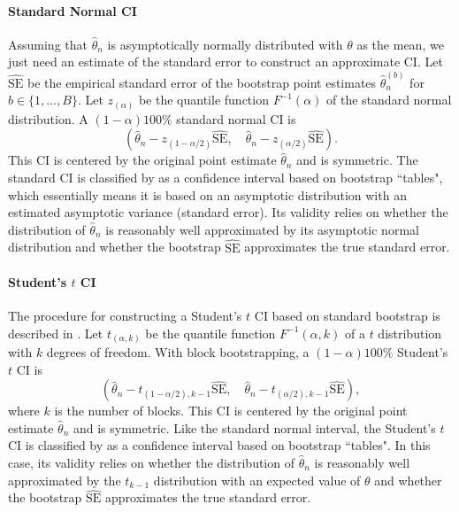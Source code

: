 \documentclass[10pt]{article}
\begin{document}
\paragraph{Standard Normal CI}
Assuming that $\hat\theta_n$ is asymptotically normally distributed with 
$\theta$ as the mean, we just need an estimate of the standard error to 
construct an approximate CI.\citep{efron1993introduction} Let
$\widehat{\text{SE}}$ be the empirical standard error of the bootstrap point 
estimates $\hat\theta_n^{(b)}$ for $b \in \{1, \ldots, B\}$. Let $z_{(\alpha)}$ 
be the quantile function $F^{-1}(\alpha)$ of the standard normal distribution. 
A $(1 - \alpha)100\%$ standard normal CI is
\[
(\hat{\theta}_{n} - z_{(1-\alpha/2)}\widehat{\text{SE}}, \quad
\hat{\theta}_{n} - z_{(\alpha/2)}\widehat{\text{SE}}).
\]
This CI is centered by the original point estimate $\hat\theta_n$ and is 
symmetric. The standard CI is classified by \citet{efron1993introduction} 
as a confidence interval based on bootstrap ``tables", which essentially means 
it is based on an asymptotic 
distribution with an estimated asymptotic variance (standard error). Its 
validity relies on whether the distribution of $\hat\theta_n$ is reasonably well 
approximated by its asymptotic normal distribution and whether the bootstrap
$\widehat{\text{SE}}$ approximates the true standard error.


\paragraph{Student's $t$ CI}
The procedure for constructing a Student's $t$ CI based on standard bootstrap is 
described in \citet{efron1993introduction}. Let $t_{(\alpha, k)}$ be the 
quantile function $F^{-1}(\alpha, k)$ of a $t$ distribution with $k$ degrees of 
freedom. With 
block bootstrapping, 
a $(1 - \alpha)100\%$ Student's $t$ CI is
\[
(\hat{\theta}_{n} - t_{(1-\alpha/2), k - 1}\widehat{\text{SE}}, \quad
\hat{\theta}_{n} - t_{(\alpha/2), k -1}\widehat{\text{SE}}),
\]
where $k$ is the number of blocks. This CI is centered by the original point 
estimate $\hat\theta_n$ and is symmetric. Like the standard normal interval, the
Student's $t$ CI is classified by \citet{efron1993introduction} 
as a confidence interval based on bootstrap ``tables". In this case, its 
validity relies on whether the distribution of $\hat\theta_n$ is reasonably well 
approximated by the $t_{k-1}$ distribution with an expected value of $\theta$ 
and whether the bootstrap $\widehat{\text{SE}}$ approximates the true standard 
error.
\end{document}
